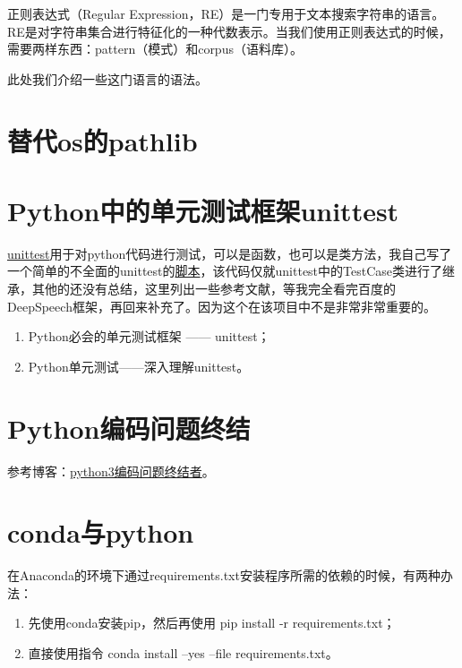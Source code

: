 正则表达式（Regular Expression，RE）是一门专用于文本搜索字符串的语言。RE是对字符串集合进行特征化的一种代数表示。当我们使用正则表达式的时候，需要两样东西：pattern（模式）和corpus（语料库）。

此处我们介绍一些这门语言的语法。



\section{替代os的pathlib}


\section{Python中的单元测试框架unittest}
\href{https://docs.python.org/2.7/library/unittest.html}{unittest}用于对python代码进行测试，可以是函数，也可以是类方法，我自己写了一个简单的不全面的unittest的\href{https://github.com/MXuer/codes/tree/master/unittest}{脚本}，该代码仅就unittest中的TestCase类进行了继承，其他的还没有总结，这里列出一些参考文献，等我完全看完百度的DeepSpeech框架，再回来补充了。因为这个在该项目中不是非常非常重要的。
\begin{enumerate}
  \item Python必会的单元测试框架 —— unittest\cite{csdn-unittest}；
  \item Python单元测试——深入理解unittest\cite{cnblogs-unittest}。
\end{enumerate}


\section{Python编码问题终结}
参考博客：\href{https://cloud.tencent.com/developer/article/1027643}{python3编码问题终结者}。


\section{conda与python}
在Anaconda的环境下通过requirements.txt安装程序所需的依赖的时候，有两种办法：
\begin{enumerate}
  \item 先使用conda安装pip，然后再使用 pip install -r requirements.txt；
  \item 直接使用指令 conda install --yes --file requirements.txt。
\end{enumerate}